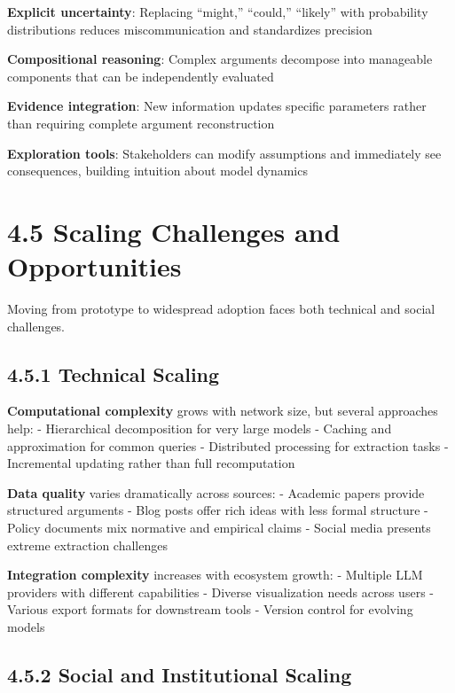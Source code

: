 \documentclass[
  11pt,
  letterpaper,
]{book}
\begin{document}
\textbf{Explicit uncertainty}: Replacing ``might,'' ``could,''
``likely'' with probability distributions reduces miscommunication and
standardizes precision

\textbf{Compositional reasoning}: Complex arguments decompose into
manageable components that can be independently evaluated

\textbf{Evidence integration}: New information updates specific
parameters rather than requiring complete argument reconstruction

\textbf{Exploration tools}: Stakeholders can modify assumptions and
immediately see consequences, building intuition about model dynamics

\section*{4.5 Scaling Challenges and Opportunities}\label{sec-scaling}


Moving from prototype to widespread adoption faces both technical and
social challenges.

\subsection*{4.5.1 Technical Scaling}\label{sec-technical-scaling}

\textbf{Computational complexity} grows with network size, but several
approaches help: - Hierarchical decomposition for very large models -
Caching and approximation for common queries - Distributed processing
for extraction tasks - Incremental updating rather than full
recomputation

\textbf{Data quality} varies dramatically across sources: - Academic
papers provide structured arguments - Blog posts offer rich ideas with
less formal structure - Policy documents mix normative and empirical
claims - Social media presents extreme extraction challenges

\textbf{Integration complexity} increases with ecosystem growth: -
Multiple LLM providers with different capabilities - Diverse
visualization needs across users - Various export formats for downstream
tools - Version control for evolving models

\subsection*{4.5.2 Social and Institutional
Scaling}\label{sec-social-scaling}
\end{document}
